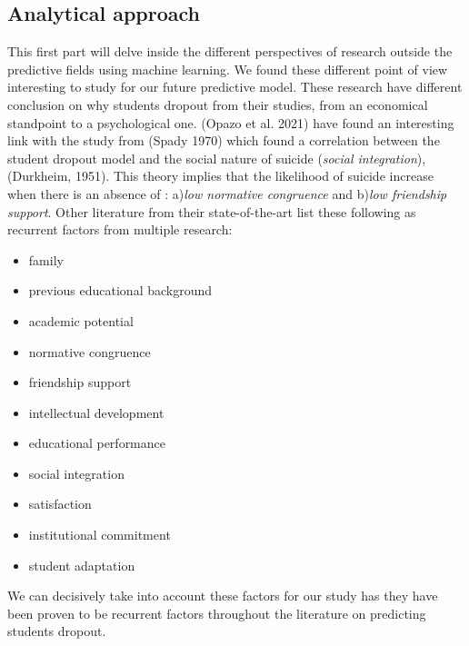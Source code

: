 \documentclass[conference]{IEEEtran}
\begin{document}
\subsection{Analytical approach}
\label{subsec:soa_analyticalapproeach}
This first part will delve inside the different perspectives of research outside the predictive fields using machine learning. We found these different point of view interesting to study for our future predictive model. These research have different conclusion on why students dropout from their studies, from an economical standpoint to a psychological one.
(Opazo et al. 2021)\cite{opazo_analysis_2021} have found an interesting link with the study from (Spady 1970) which found a correlation between the student dropout model and the social nature of suicide (\textit{social integration}), (Durkheim, 1951). This theory implies that the likelihood of suicide increase when there is an absence of : a)\textit{low normative congruence} and b)\textit{low friendship support}. Other literature from their state-of-the-art list these following as recurrent factors from multiple research\cite{opazo_analysis_2021}\cite{spady_dropouts_1970,tinto_dropout_1975,caspersen_teachers_2015,lidia_problema_2006,bejarano_caso_2017,sinchi_acceso_2018,cavero_voluntad_2011,velasco_alisis_nodate}: 
\begin{itemize}
\item family
\item previous educational background
\item academic potential
\item normative congruence
\item friendship support
\item intellectual development
\item educational performance
\item social integration
\item satisfaction
\item institutional commitment
\item student adaptation
\end{itemize}
We can decisively take into account these factors for our study has they have been proven to be recurrent factors throughout the literature on predicting students dropout.
\end{document}
